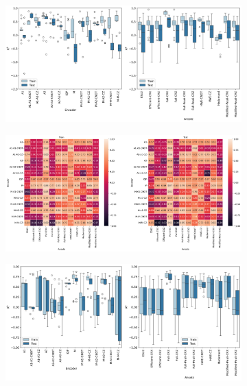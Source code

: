 \documentclass[journal=jacsat,manuscript=article]{achemso}
\begin{document}
\begin{figure}[H]
\begin{subfigure}[b]{0.49\textwidth}
		\caption{}
		\label{fig:quadratic_heatplots}
	\end{subfigure}
	\hfill
	\begin{subfigure}[b]{0.49\textwidth}
		\centering
		\includegraphics[width=\textwidth]{../images/Function_Fitting/fivequbit/quadratic_boxplots.png}
		\caption{}
		\label{fig:quadratic_boxplots}
	\end{subfigure}
	\hfill		
	\begin{subfigure}[b]{0.49\textwidth}
		\centering
		\includegraphics[width=\textwidth]{../images/Function_Fitting/fivequbit/sine_heatplots.png}
		\caption{}
		\label{fig:sine_heatplots}
	\end{subfigure}
	\hfill		
	\begin{subfigure}[b]{0.49\textwidth}
		\centering
		\includegraphics[width=\textwidth]{../images/Function_Fitting/fivequbit/sine_boxplots.png}
		\caption{}
		\label{fig:sine_boxplots}
	\end{subfigure}
	\hfill		
	\caption{}
	\label{fig:fivequbit_ff_heat}
\end{figure}
\end{document}
